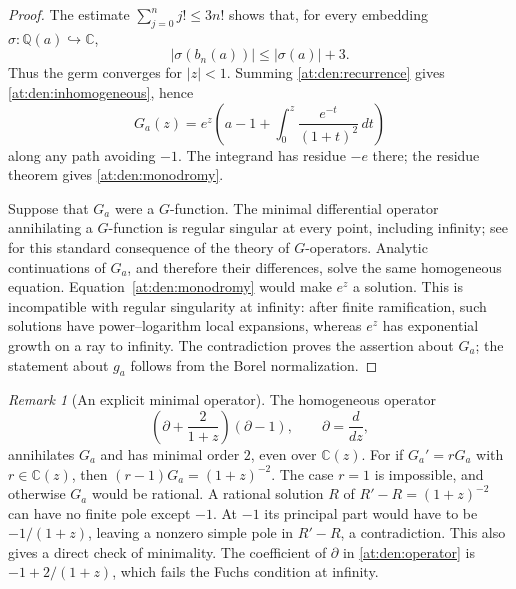 \documentclass[11pt,a4paper]{article}
\newcommand{\Q}{\mathbb Q}
\newcommand{\C}{\mathbb C}
\theoremstyle{definition}
\theoremstyle{remark}
\newtheorem{remark}[theorem]{Remark}
\numberwithin{equation}{section}
\begin{document}
\begin{proof}
The estimate $\sum_{j=0}^n j!\leq3n!$ shows that, for every embedding
$\sigma:\Q(a)\hookrightarrow\C$,
\begin{equation}\label{at:den:conjugate-bound}
 |\sigma(b_n(a))|\leq |\sigma(a)|+3.
\end{equation}
Thus the germ converges for $|z|<1$.  Summing
\eqref{at:den:recurrence} gives \eqref{at:den:inhomogeneous}, hence
\begin{equation}\label{at:den:integral-solution}
 G_a(z)=e^z\left(a-1+\int_0^z\frac{e^{-t}}{(1+t)^2}\,dt\right)
\end{equation}
along any path avoiding $-1$.  The integrand has residue $-e$ there;
the residue theorem gives \eqref{at:den:monodromy}.

Suppose that $G_a$ were a $G$-function.  The minimal differential
operator annihilating a $G$-function is regular singular at every point,
including infinity; see \cite[Section~1]{pm:FischlerRivoal2016} for this
standard consequence of the theory of $G$-operators.  Analytic
continuations of $G_a$, and therefore their differences, solve the same
homogeneous equation.  Equation~\eqref{at:den:monodromy} would make $e^z$
a solution.  This is incompatible with regular singularity at infinity:
after finite ramification, such solutions have power--logarithm local
expansions, whereas $e^z$ has exponential growth on a ray to infinity.
The contradiction proves the assertion about $G_a$; the statement about
$g_a$ follows from the Borel normalization.
\end{proof}

\begin{remark}[An explicit minimal operator]\label{at:den:minimal-operator}
The homogeneous operator
\begin{equation}\label{at:den:operator}
 \left(\partial+\frac{2}{1+z}\right)(\partial-1),
 \qquad \partial=\frac{d}{dz},
\end{equation}
annihilates $G_a$ and has minimal order $2$, even over $\C(z)$.
For if $G_a'=rG_a$ with $r\in\C(z)$, then
$(r-1)G_a=(1+z)^{-2}$.  The case $r=1$ is impossible, and otherwise
$G_a$ would be rational.  A rational solution $R$ of
$R'-R=(1+z)^{-2}$ can have no finite pole except $-1$.  At $-1$ its
principal part would have to be $-1/(1+z)$, leaving a nonzero simple
pole in $R'-R$, a contradiction.  This also gives a direct check of
minimality.  The coefficient of $\partial$ in \eqref{at:den:operator} is
$-1+2/(1+z)$, which fails the Fuchs condition at infinity.
\end{remark}
\end{document}
